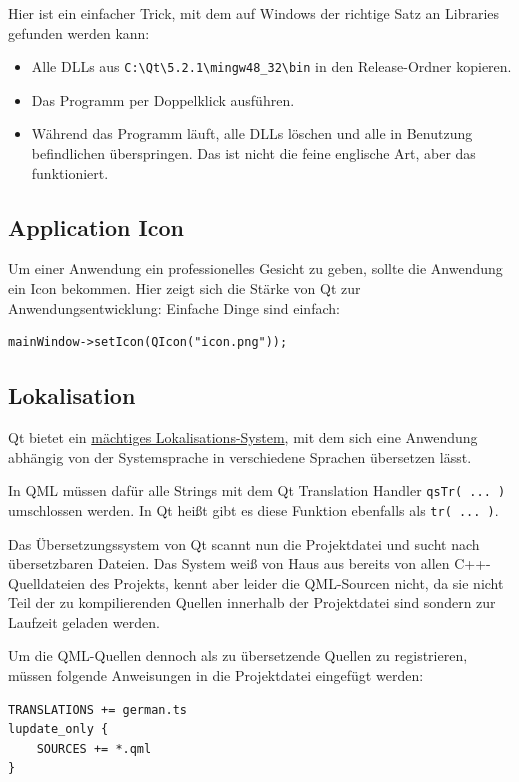 \documentclass[a4paper]{article}
\begin{document}
Hier ist ein einfacher Trick, mit dem auf Windows der richtige Satz an Libraries gefunden werden kann:
\begin{itemize}
\item Alle DLLs aus \verb~C:\Qt\5.2.1\mingw48_32\bin~ in den Release-Ordner kopieren.
\item Das Programm per Doppelklick ausführen.
\item Während das Programm läuft, alle DLLs löschen und alle in Benutzung befindlichen überspringen.
Das ist nicht die feine englische Art, aber das funktioniert.
\end{itemize}
\subsection{Application Icon}
\label{sec-2-4}
Um einer Anwendung ein professionelles Gesicht zu geben, sollte die Anwendung ein Icon bekommen. Hier zeigt sich die Stärke von Qt zur Anwendungsentwicklung: Einfache Dinge sind einfach:
\begin{verbatim}
mainWindow->setIcon(QIcon("icon.png"));
\end{verbatim}
\subsection{Lokalisation}
\label{sec-2-5}
Qt bietet ein \href{http://qt-project.org/doc/qt-5/linguist-programmers.html}{mächtiges Lokalisations-System}, mit dem sich eine Anwendung abhängig von der Systemsprache in verschiedene Sprachen übersetzen lässt.

In QML müssen dafür alle Strings mit dem Qt Translation Handler \verb~qsTr( ... )~ umschlossen werden. In Qt heißt gibt es diese Funktion ebenfalls als \verb~tr( ... )~.

Das Übersetzungssystem von Qt scannt nun die Projektdatei und sucht nach übersetzbaren Dateien. Das System weiß von Haus aus bereits von allen C++-Quelldateien des Projekts, kennt aber leider die QML-Sourcen nicht, da sie nicht Teil der zu kompilierenden Quellen innerhalb der Projektdatei sind sondern zur Laufzeit geladen werden.

Um die QML-Quellen dennoch als zu übersetzende Quellen zu registrieren, müssen folgende Anweisungen in die Projektdatei eingefügt werden:

\begin{verbatim}
TRANSLATIONS += german.ts
lupdate_only {
    SOURCES += *.qml
}
\end{verbatim}
\end{document}
